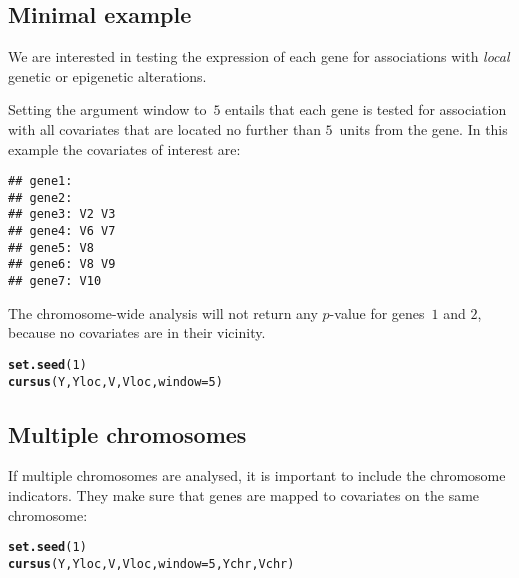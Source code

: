 \documentclass{article}\usepackage[]{graphicx}\usepackage[]{color}
\makeatletter
\newcommand{\hlnum}[1]{\textcolor[rgb]{0.686,0.059,0.569}{#1}}%
\newcommand{\hlstd}[1]{\textcolor[rgb]{0.345,0.345,0.345}{#1}}%
\newcommand{\hlkwc}[1]{\textcolor[rgb]{0.333,0.667,0.333}{#1}}%
\newcommand{\hlkwd}[1]{\textcolor[rgb]{0.737,0.353,0.396}{\textbf{#1}}}%
\newenvironment{kframe}{%
 \def\at@end@of@kframe{}%
 \ifinner\ifhmode%
  \def\at@end@of@kframe{\end{minipage}}%
  \begin{minipage}{\columnwidth}%
 \fi\fi%
 \def\FrameCommand##1{\hskip\@totalleftmargin \hskip-\fboxsep
 \colorbox{shadecolor}{##1}\hskip-\fboxsep
     \hskip-\linewidth \hskip-\@totalleftmargin \hskip\columnwidth}%
 \MakeFramed {\advance\hsize-\width
   \@totalleftmargin\z@ \linewidth\hsize
   \@setminipage}}%
 {\par\unskip\endMakeFramed%
 \at@end@of@kframe}
\newenvironment{knitrout}{}{} %
\makeatother
\begin{document}
\subsection{Minimal example}
\label{cursus_minimal_example}

We are interested in testing the expression of each gene for associations with \textit{local} genetic or epigenetic alterations.

Setting the argument window to~$5$ entails that each gene is tested for association with all covariates that are located no further than $5$~units from the gene. In this example the covariates of interest are:

\begin{knitrout}
\color{fgcolor}\begin{kframe}
\begin{verbatim}
## gene1:  
## gene2:  
## gene3: V2 V3 
## gene4: V6 V7 
## gene5: V8 
## gene6: V8 V9 
## gene7: V10
\end{verbatim}
\end{kframe}
\end{knitrout}

The chromosome-wide analysis will not return any \mbox{$p$-value} for genes~$1$ and $2$, because no covariates are in their vicinity.
\begin{knitrout}
\color{fgcolor}\begin{kframe}
\begin{alltt}
\hlkwd{set.seed}\hlstd{(}\hlnum{1}\hlstd{)}
\hlkwd{cursus}\hlstd{(Y,Yloc,V,Vloc,}\hlkwc{window}\hlstd{=}\hlnum{5}\hlstd{)}
\end{alltt}
\end{kframe}
\end{knitrout}

\subsection{Multiple chromosomes}
\label{cursus_mutiple_chromosomes}

If multiple chromosomes are analysed, it is important to include the chromosome indicators. They make sure that genes are mapped to covariates on the same chromosome:
\begin{knitrout}
\color{fgcolor}\begin{kframe}
\begin{alltt}
\hlkwd{set.seed}\hlstd{(}\hlnum{1}\hlstd{)}
\hlkwd{cursus}\hlstd{(Y,Yloc,V,Vloc,}\hlkwc{window}\hlstd{=}\hlnum{5}\hlstd{,Ychr,Vchr)}
\end{alltt}
\end{kframe}
\end{knitrout}
\end{document}
